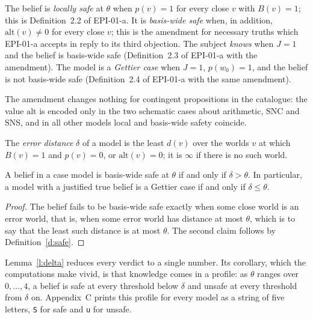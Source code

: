 \documentclass{situationist-preprint}
\begin{document}
\begin{definition}\label{d:safe}
The belief is \emph{locally safe} at $\theta$ when $p(v) = 1$ for every close $v$ with $B(v) = 1$; this is Definition~2.2 of EPI-01-a. It is \emph{basis-wide safe} when, in addition, $\mathrm{alt}(v) \neq 0$ for every close $v$; this is the amendment for necessary truths which EPI-01-a accepts in reply to its third objection. The subject \emph{knows} when $J = 1$ and the belief is basis-wide safe (Definition~2.3 of EPI-01-a with the amendment). The model is a \emph{Gettier case} when $J = 1$, $p(w_0) = 1$, and the belief is not basis-wide safe (Definition~2.4 of EPI-01-a with the same amendment).
\end{definition}

The amendment changes nothing for contingent propositions in the catalogue: the value $\mathrm{alt}$ is encoded only in the two schematic cases about arithmetic, SNC and SNS, and in all other models local and basis-wide safety coincide.

\begin{definition}\label{d:delta}
The \emph{error distance} $\delta$ of a model is the least $d(v)$ over the worlds $v$ at which $B(v) = 1$ and $p(v) = 0$, or $\mathrm{alt}(v) = 0$; it is $\infty$ if there is no such world.
\end{definition}

\begin{lemma}\label{l:delta}
A belief in a case model is basis-wide safe at $\theta$ if and only if $\delta > \theta$. In particular, a model with a justified true belief is a Gettier case if and only if $\delta \leq \theta$.
\end{lemma}

\begin{proof}
The belief fails to be basis-wide safe exactly when some close world is an error world, that is, when some error world has distance at most $\theta$, which is to say that the least such distance is at most $\theta$. The second claim follows by Definition~\ref{d:safe}.
\end{proof}

Lemma~\ref{l:delta} reduces every verdict to a single number. Its corollary, which the computations make vivid, is that knowledge comes in a profile: as $\theta$ ranges over $0, \ldots, 4$, a belief is safe at every threshold below $\delta$ and unsafe at every threshold from $\delta$ on. Appendix~C prints this profile for every model as a string of five letters, \texttt{S} for safe and \texttt{u} for unsafe.
\end{document}
